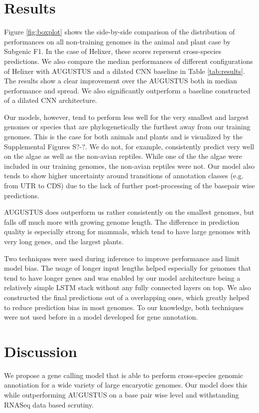 \documentclass{bioinfo}
\begin{document}
\section{Results}
Figure \ref{fig:boxplot} shows the side-by-side comparison of the distribution of performances on all non-training genomes in the animal and plant case by Subgenic F1. In the case of Helixer, these scores represent cross-species predictions. We also compare the median performances of different configurations of Helixer with AUGUSTUS and a dilated CNN baseline in Table \ref{tab:results}. The results show a clear improvement over the AUGUSTUS both in median performance and spread. We also significantly outperform a baseline constructed of a dilated CNN architecture.

Our models, however, tend to perform less well for the very smallest and largest genomes or species that are phylogenetically the furthest away from our training genomes. This is the case for both animals and plants and is visualized by the Supplemental Figures S?-?. We do not, for example, consistently predict very well on the algae as well as the non-avian reptiles. While one of the the algae were included in our training genomes, the non-avian reptiles were not. Our model also tends to show higher uncertainty around transitions of annotation classes (e.g. from UTR to CDS) due to the lack of further post-processing of the basepair wise predictions.

AUGUSTUS does outperform us rather consistently on the smallest genomes, but falls off much more with growing genome length. The difference in prediction quality is especially strong for mammals, which tend to have large genomes with very long genes, and the largest plants.

Two techniques were used during inference to improve performance and limit model bias. The usage of longer input lengths helped especially for genomes that tend to have longer genes and was enabled by our model architecture being a relatively simple LSTM stack without any fully connected layers on top. We also constructed the final predictions out of a overlapping ones, which greatly helped to reduce prediction bias in most genomes. To our knowledge, both techniques were not used before in a model developed for gene annotation. 

\section{Discussion}
We propose a gene calling model that is able to perform cross-species genomic annotiation for a wide variety of large eucaryotic genomes. Our model does this while outperforming AUGUSTUS on a base pair wise level and withstanding RNASeq data based scrutiny. 
\end{document}
